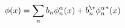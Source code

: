 \begin{equation}
  \label{eq:free81}
  \phi(x) = \sum_n b_n \phi_n^\alpha(x) + b_n^\+{\phi^\alpha_n}^*(x)
\end{equation}

